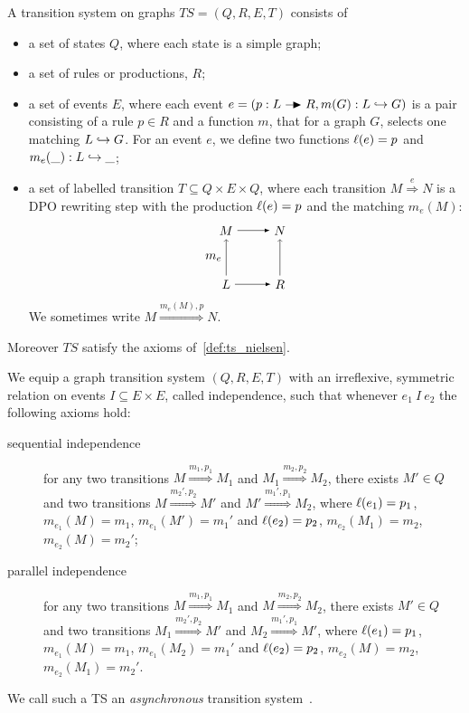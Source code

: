\begin{definition}[TS on graphs]
  A transition system on graphs $TS = (Q,R,E,T)$ consists of
  \begin{itemize}
  \item a set of states $Q$, where each state is a simple graph;
  \item a set of rules or productions, $R$;
  \item a set of events $E$, where each event $e=(p:L\action R,m(G):L\emb G)$ is a pair consisting of a rule $p\in R$ and a function $m$, that for a graph $G$, selects one matching $L\hookrightarrow G$. For an event $e$, we define two functions $\ell(e) = p$ and $m_e(\_): L\hookrightarrow \_$;
  \item a set of labelled transition $T\subseteq Q\times E\times Q$, where each transition $M \overset{e}{\Rightarrow} N$ is a DPO rewriting step with the production $\ell(e) = p$ and the matching $m_e(M)$:
    \[
    \begin{tikzpicture} %
      \node (l) at (-1.5,0) {\(L\)};
      \node (r) at (0,0) {\(R\)};
      \node (m) at (-1.5,1.5) {\(M\)};
      \node (n) at (0,1.5) {\(N\)};
      \draw [->] (l) -- node [left,midway] {\(m_e\)}  (m);
      \draw [>=latex, ->] (l) -- (r);
      \draw [>=latex, ->] (m) -- (n);
      \draw [->] (r) -- (n);
    \end{tikzpicture}
    \]
    We sometimes write $M\overset{m_e(M),p}{\Rightarrow} N$.
  \end{itemize}
  Moreover $TS$ satisfy the axioms of~\autoref{def:ts_nielsen}.
\end{definition}

\begin{definition}
  We equip a graph transition system $(Q,R,E,T)$ with an irreflexive, symmetric relation on events $I\subseteq E\times E$, called independence, such that whenever $e_1~I~e_2$ the following axioms hold:
  \begin{description}
  \item[sequential independence]
    for any two transitions $M\overset{m_1,p_1}{\Rightarrow} M_1$ and $M_1\overset{m_2,p_2}{\Rightarrow} M_2$, there exists $M'\in Q$ and two transitions $M\overset{m_2',p_2}{\Rightarrow} M'$ and $M'\overset{m_1',p_1}{\Rightarrow} M_2$, where $\ell(e_1)=p_1$, $m_{e_1}(M) = m_1$, $m_{e_1}(M') = m_1'$ and $\ell(e_2)=p_2$, $m_{e_2}(M_1) = m_2$, $m_{e_2}(M) = m_2'$;
  \item[parallel independence]
    for any two transitions $M\overset{m_1,p_1}{\Rightarrow} M_1$ and $M\overset{m_2,p_2}{\Rightarrow} M_2$, there exists $M'\in Q$ and two transitions $M_1\overset{m_2',p_2}{\Rightarrow} M'$ and $M_2\overset{m_1',p_1}{\Rightarrow} M'$, where $\ell(e_1)=p_1$, $m_{e_1}(M) = m_1$, $m_{e_1}(M_2) = m_1'$ and $\ell(e_2)=p_2$, $m_{e_2}(M) = m_2$, $m_{e_2}(M_1) = m_2'$.
  \end{description}
  We call such a TS an \emph{asynchronous} transition system~\cite{Mukund93}.
\end{definition}


